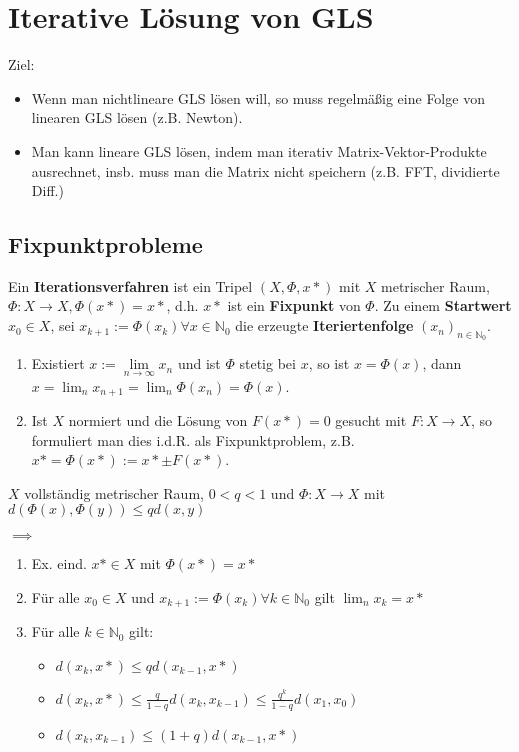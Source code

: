 \section{Iterative Lösung von GLS}

Ziel:
\begin{itemize}
	\item Wenn man nichtlineare GLS lösen will, so muss regelmäßig eine Folge von linearen GLS lösen (z.B. Newton).
	\item Man kann lineare GLS lösen, indem man iterativ Matrix-Vektor-Produkte ausrechnet, insb. muss man die Matrix nicht speichern (z.B. FFT, dividierte Diff.)
\end{itemize}

\subsection{Fixpunktprobleme}

\begin{definition}
	Ein \textbf{Iterationsverfahren} ist ein Tripel $(X, \Phi, x*)$ mit $X$ metrischer Raum, $\Phi: X \rightarrow X, \Phi(x*) = x*$, d.h. $x*$ ist ein \textbf{Fixpunkt} von $\Phi$. Zu einem \textbf{Startwert} $x_0 \in X$, sei $x_{k+1} := \Phi(x_k) \forall x \in \mathbb{N}_0$ die erzeugte \textbf{Iteriertenfolge} $(x_n)_{n \in \mathbb{N}_0}$.
\end{definition}

\begin{remark}
	\begin{enumerate}
		\item Existiert $x := \lim\limits_{n\rightarrow\infty} x_n$ und ist $\Phi$ stetig bei $x$, so ist $x = \Phi(x)$, dann $x = \lim_n x_{n+1} = \lim_n \Phi(x_n) = \Phi(x)$.
		\item Ist $X$ normiert und die Lösung von $F(x*)=0$ gesucht mit $F: X \rightarrow X$, so formuliert man dies i.d.R. als Fixpunktproblem, z.B. $x* = \Phi(x*) := x* \pm F(x*)$.
	\end{enumerate}
\end{remark}

\begin{theorem}
	$X$ vollständig metrischer Raum, $0 < q < 1$ und $\Phi: X \rightarrow X$ mit $d(\Phi(x), \Phi(y)) \leq q d(x,y)$
	
	$\implies$
	\begin{enumerate}
		\item Ex. eind. $x* \in X$ mit $\Phi(x*) = x*$
		\item Für alle $x_0 \in X$ und $x_{k+1} := \Phi(x_k) \forall k \in \mathbb{N}_0$ gilt $\lim_n x_k = x*$
		\item Für alle $k \in \mathbb{N}_0$ gilt:
		\begin{itemize}
			\item $d(x_k, x*) \leq q d(x_{k-1}, x*)$
			\item $d(x_k, x*) \leq \frac{q}{1-q} d(x_k, x_{k-1}) \leq \frac{q^k}{1-q}d(x_1, x_0)$
			\item $d(x_k, x_{k-1}) \leq (1+q) d(x_{k-1}, x*)$
		\end{itemize}
	\end{enumerate}
\end{theorem}

